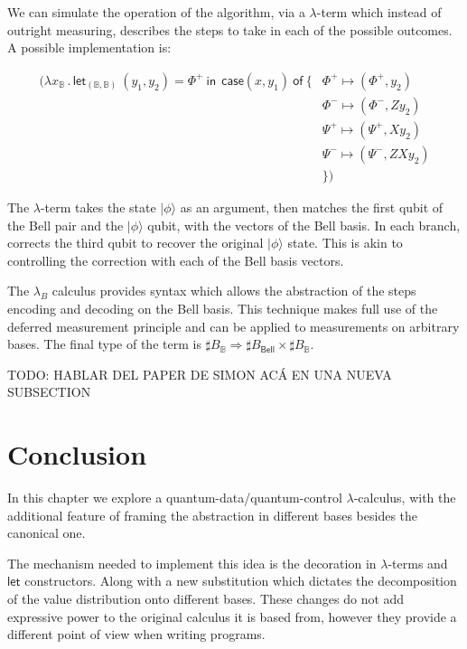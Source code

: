 \documentclass[runningheads,orivec,envcountsame,envcountsect]{llncs}
\newcommand\ket[1]{\ensuremath{|#1\rangle}}
\def\Pair#1#2{(#1,#2)} %
\def\Lam#1#2#3{\lambda#1_{#2}\,{.}\,#3} %
\def\letkeyword{\mathsf{let}}
\def\inkeyword{\mathsf{in}}
\def\LetP#1#2#3#4#5#6{\letkeyword_{\Pair{#2}{#4}}~\Pair{#1}{#3}=#5~\inkeyword~#6}
\def\Arr{\Rightarrow}
\newcommand\B{\mathbb B}
\newcommand{\Bell}{\mathsf{Bell}}
\newcommand{\lambdaB}{\lambda_B}
\newcommand\basis[1]{\ensuremath{B_{ #1 }}}
\begin{document}
We can simulate the operation of the algorithm, via a $\lambda$-term which instead of outright measuring, describes the steps to take in each of the possible outcomes. A possible implementation is:

\begin{align*}
    (\Lam{x}{\B}{\LetP{y_1}{\B}{y_2}{\B}{\Phi^+}{ ~\mathsf{case } \Pair{x}{y_1}  ~\mathsf{ of }~\{ &\Phi^+\mapsto \Pair{\Phi^+}{y_2}\\
    &\Phi^-\mapsto \Pair{\Phi^-}{Z y_2}\\
    &\Psi^+\mapsto \Pair{\Psi^+}{X y_2}\\
    &\Psi^-\mapsto \Pair{\Psi^-}{ZX y_2}\\
    &\}}})
\end{align*}

The $\lambda$-term takes the state $\ket{\phi}$ as an argument, then matches the first qubit of the Bell pair and the $\ket{\phi}$ qubit, with the vectors of the Bell basis. In each branch, corrects the third qubit to recover the original $\ket{\phi}$ state. This is akin to controlling the correction with each of the Bell basis vectors.

The $\lambdaB$ calculus provides syntax which allows the abstraction of the steps encoding and decoding on the Bell basis. This technique makes full use of the deferred measurement principle and can be applied to measurements on arbitrary bases. The final type of the term is $\sharp\basis{\B}\Arr \sharp\basis{\Bell}\times \sharp\basis{\B}$.

{\color{red} TODO: HABLAR DEL PAPER DE SIMON ACÁ EN UNA NUEVA SUBSECTION}

\section{Conclusion}\label{sec:conclusion}

In this chapter we explore a quantum-data/quantum-control $\lambda$-calculus, with the additional feature of framing the abstraction in different bases besides the canonical one.

The mechanism needed to implement this idea is the decoration in $\lambda$-terms and $\mathsf{let}$ constructors. Along with a new substitution which dictates the decomposition of the value distribution onto different bases. These changes do not add expressive power to the original calculus it is based from, however they provide a different point of view when writing programs. 
\end{document}
